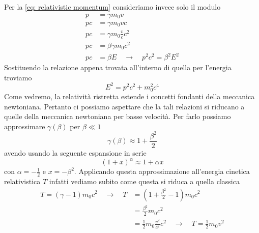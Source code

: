 Per la \eqref{eq: relativistic momentum} consideriamo invece solo il modulo
    \begin{align*}
        p & = \gamma m_0 v \\
        p c & = \gamma m_0 v c \\
        p c & = \gamma m_0 \frac{v}{c} c^2 \\
        p c & = \beta \gamma m_0 c^2 \\
        p c & = \beta E \quad \to \quad  p^2 c^2 = \beta^2 E^2
    \end{align*}
Sostituendo la relazione appena trovata all'interno di quella per l'energia troviamo
    \begin{equation*}
        E^2 = p^2 c^2 + m_0^2 c^4
    \end{equation*}
Come vedremo, la relatività ristretta estende i concetti fondanti della meccanica newtoniana. Pertanto ci possiamo aspettare che la tali relazioni si riducano a quelle della meccanica newtoniana per basse velocità. Per farlo possiamo approssimare $\gamma(\beta)$ per $\beta \ll 1$
    \begin{equation*}
        \gamma(\beta) \approx 1 + \frac{\beta^2}{2}
    \end{equation*}
avendo usando la seguente espansione in serie
    \begin{equation*}
        (1 + x)^\alpha \approx 1 + \alpha x 
    \end{equation*}
con $\alpha = -\frac{1}{2}$ e $x = -\beta^2$. Applicando questa approssimazione all'energia cinetica relativistica $T$ infatti vediamo subito come questa si riduca a quella classica
    \begin{align*}
        T = (\gamma - 1) m_0 c^2 \quad \to \quad T & = (1 + \frac{\beta^2}{2} - 1) m_0 c^2 \\
        & = \frac{\beta^2}{2} m_0 c^2 \\
        & = \frac{1}{2} m_0 \frac{v^2}{c^2} c^2 \quad \to \quad T = \frac{1}{2} m_0 v^2
    \end{align*}

